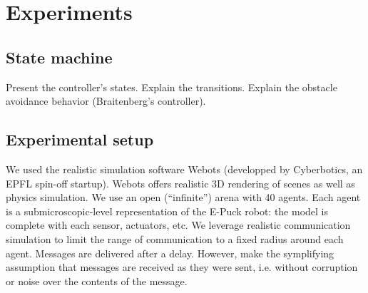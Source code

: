 \documentclass[a4paper, 10pt, conference]{ieeeconf}
\begin{document}

\section{Experiments}
  \subsection{State machine}
  Present the controller's states. Explain the transitions. Explain the obstacle avoidance behavior (Braitenberg's controller).

  \subsection{Experimental setup} \label{simulations}
  We used the realistic simulation software Webots (developped by Cyberbotics, an EPFL spin-off startup). Webots offers realistic 3D rendering of scenes as well as physics simulation. We use an open (``infinite'') arena with 40 agents. Each agent is a submicroscopic-level representation of the E-Puck robot: the model is complete with each sensor, actuators, etc. We leverage realistic communication simulation to limit the range of communication to a fixed radius around each agent. Messages are delivered after a delay. However, make the symplifying assumption that messages are received as they were sent, i.e. without corruption or noise over the contents of the message.\\
\end{document}
